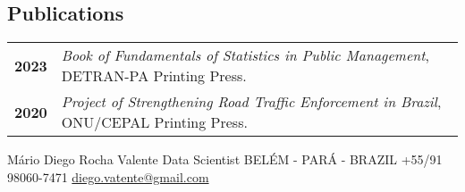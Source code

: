 \documentclass[lighthipster]{simplehipstercv}
\newlength{\rightcolwidth}
\begin{document}
\begin{paracol}{2}
\begin{minipage}[t]{0.3\textwidth}
\end{minipage}\hfill
\begin{minipage}[t]{0.3\textwidth}
\section*{Publications}
\begin{tabular}{>{\footnotesize\bfseries}r >{\footnotesize}p{}}
    2023 & \emph{Book of Fundamentals of Statistics in Public Management}, DETRAN-PA Printing Press. \\
    2020 &  \emph{Project of Strengthening Road Traffic Enforcement in Brazil}, ONU/CEPAL Printing Press.
\end{tabular}
\bigskip

\vspace{3em}
\end{minipage}






\vfill{} %

\setlength{\parindent}{0pt}
\begin{minipage}[t]{\rightcolwidth}
\begin{center}\fontfamily{\sfdefault}\selectfont \color{black!70}
{\small Mário Diego Rocha Valente  Data Scientist  BELÉM - PARÁ - BRAZIL  \newline {}  +55/91 98060-7471  \protect\url{diego.vatente@gmail.com}
}
\end{center}
\end{minipage}

\end{paracol}
\end{document}
